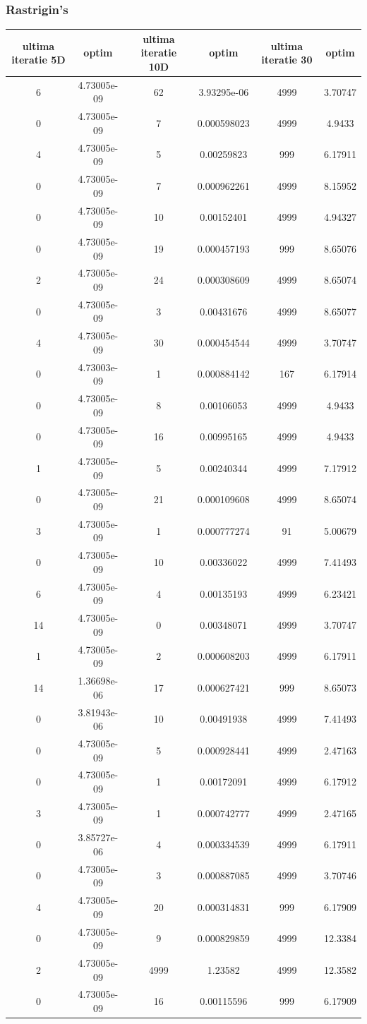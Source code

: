 \documentclass{article}
\begin{document}
\subsubsection{Rastrigin’s}
\begin{tabular}{cccccc}
\hline
ultima iteratie 5D& optim&ultima iteratie 10D& optim&ultima iteratie 30&optim\\
\hline
6&4.73005e-09&62&3.93295e-06&4999&3.70747 \\ \hline
0&4.73005e-09&7&0.000598023&4999&4.9433 \\ \hline
4&4.73005e-09&5&0.00259823&999&6.17911 \\ \hline
0&4.73005e-09&7&0.000962261&4999&8.15952 \\ \hline
0&4.73005e-09&10&0.00152401&4999&4.94327 \\ \hline
0&4.73005e-09&19&0.000457193&999&8.65076 \\ \hline
2&4.73005e-09&24&0.000308609&4999&8.65074 \\ \hline
0&4.73005e-09&3&0.00431676&4999&8.65077 \\ \hline
4&4.73005e-09&30&0.000454544&4999&3.70747 \\ \hline
0&4.73003e-09&1&0.000884142&167&6.17914 \\ \hline
0&4.73005e-09&8&0.00106053&4999&4.9433 \\ \hline
0&4.73005e-09&16&0.00995165&4999&4.9433 \\ \hline
1&4.73005e-09&5&0.00240344&4999&7.17912 \\ \hline
0&4.73005e-09&21&0.000109608&4999&8.65074 \\ \hline
3&4.73005e-09&1&0.000777274&91&5.00679 \\ \hline
0&4.73005e-09&10&0.00336022&4999&7.41493 \\ \hline
6&4.73005e-09&4&0.00135193&4999&6.23421 \\ \hline
14&4.73005e-09&0&0.00348071&4999&3.70747 \\ \hline
1&4.73005e-09&2&0.000608203&4999&6.17911 \\ \hline
14&1.36698e-06&17&0.000627421&999&8.65073 \\ \hline
0&3.81943e-06&10&0.00491938&4999&7.41493 \\ \hline
0&4.73005e-09&5&0.000928441&4999&2.47163 \\ \hline
0&4.73005e-09&1&0.00172091&4999&6.17912 \\ \hline
3&4.73005e-09&1&0.000742777&4999&2.47165 \\ \hline
0&3.85727e-06&4&0.000334539&4999&6.17911 \\ \hline
0&4.73005e-09&3&0.000887085&4999&3.70746 \\ \hline
4&4.73005e-09&20&0.000314831&999&6.17909 \\ \hline
0&4.73005e-09&9&0.000829859&4999&12.3384 \\ \hline
2&4.73005e-09&4999&1.23582&4999&12.3582 \\ \hline
0&4.73005e-09&16&0.00115596&999&6.17909 \\ \hline
\end{tabular}
\end{document}
